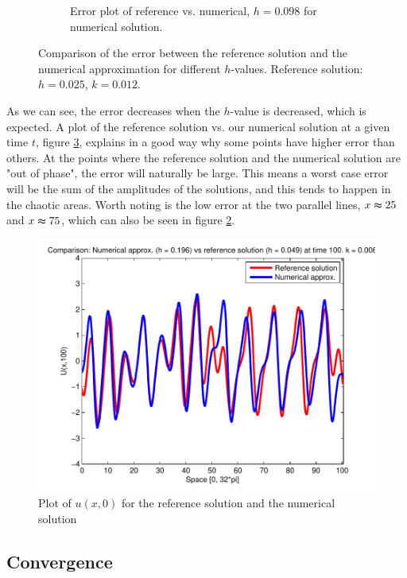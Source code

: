 \begin{figure}[H]
\begin{subfigure}[b]{0.52\textwidth}
                \caption{Error plot of reference vs. numerical, $h = 0.098$ for numerical solution.}
                \label{fig:lowError}
        \end{subfigure}
        \caption{Comparison of the error between the reference solution and the numerical approximation for different $h$-values. Reference solution: $h = 0.025$, $k = 0.012$.}\label{fig:errPlots}
\end{figure}

As we can see, the error decreases when the $h$-value is decreased, which is expected. A plot of the reference solution vs. our numerical solution at a given time $t$, figure \ref{fig:errTime}, explains in a good way why some points have higher error than others. At the points where the reference solution and the numerical solution are "out of phase", the error will naturally be large. This means a worst case error will be the sum of the amplitudes of the solutions, and this tends to happen in the chaotic areas. Worth noting is the low error at the two parallel lines, $x \thickapprox 25$ and $x \thickapprox 75$, which can also be seen in figure \ref{fig:errPlots}. 

\begin{figure}[H]
\centering
\includegraphics[scale=0.55]
{../PDFs/IMEX/comp_num_ref_t100.pdf}
\caption{Plot of $u(x,0)$ for the reference solution and the numerical solution}
\label{fig:errTime}
\end{figure}

\subsection{Convergence}
